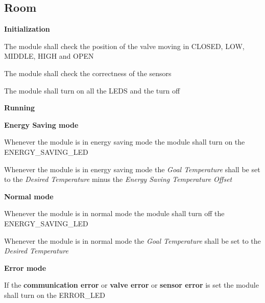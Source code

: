 	\subsection{Room}
		\begin{req_enum}
			\item \textbf{Initialization}
				\begin{req_enum}[label*=\arabic*.]
					\item The module shall check the position of the valve moving in CLOSED, LOW, MIDDLE, HIGH and OPEN
					\item The module shall check the correctness of the sensors
					\item The module shall turn on all the LEDS and the turn off
				\end{req_enum}
			\item \textbf{Running}
			\begin{req_enum}[label*=\arabic*.]
				\item \textbf{Energy Saving mode}
					\begin{req_enum}[label*=\arabic*.]
						\item Whenever the module is in energy saving mode the module shall turn on the ENERGY\_SAVING\_LED
						\item Whenever the module is in energy saving mode the \textit{Goal Temperature} shall be set to the \textit{Desired Temperature} minus the \textit{Energy Saving Temperature Offset}
					\end{req_enum}

				\item \textbf{Normal mode}
					\begin{req_enum}[label*=\arabic*.]
						\item Whenever the module is in normal mode the module shall turn off the ENERGY\_SAVING\_LED
						\item Whenever the module is in normal mode the \textit{Goal Temperature} shall be set to the \textit{Desired Temperature}
					\end{req_enum}

				\item \textbf{Error mode}
					\begin{req_enum}[label*=\arabic*.]
						\item If the \textbf{communication error} or \textbf{valve error} or \textbf{sensor error} is set the module shall turn on the ERROR\_LED
					\end{req_enum}
				\end{req_enum}
	

\end{req_enum}
